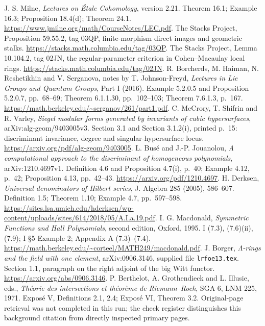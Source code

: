  J. S. Milne, \emph{Lectures on \'Etale Cohomology}, version 2.21. Theorem 16.1; Example 16.3; Proposition 18.4(d); Theorem 24.1. \url{https://www.jmilne.org/math/CourseNotes/LEC.pdf}.
 The Stacks Project, Proposition 59.55.2, tag 03QP, finite-morphism direct images and geometric stalks. \url{https://stacks.math.columbia.edu/tag/03QP}.
 The Stacks Project, Lemma 10.104.2, tag 02JN, the regular-parameter criterion in Cohen--Macaulay local rings. \url{https://stacks.math.columbia.edu/tag/02JN}.
 R. Borcherds, M. Haiman, N. Reshetikhin and V. Serganova, notes by T. Johnson-Freyd, \emph{Lectures in Lie Groups and Quantum Groups}, Part I (2016). Example 5.2.0.5 and Proposition 5.2.0.7, pp.~68--69; Theorem 6.1.1.30, pp.~102--103; Theorem 7.6.1.3, p.~167. \url{https://math.berkeley.edu/~serganov/261/part1.pdf}.
 C. McCrory, T. Shifrin and R. Varley, \emph{Siegel modular forms generated by invariants of cubic hypersurfaces}, arXiv:alg-geom/9403005v3. Section 3.1 and Section 3.1.2(i), printed p.~15: discriminant invariance, degree and singular-hypersurface locus. \url{https://arxiv.org/pdf/alg-geom/9403005}.
 L. Bus\'e and J.-P. Jouanolou, \emph{A computational approach to the discriminant of homogeneous polynomials}, arXiv:1210.4697v1. Definition 4.6 and Proposition 4.7(i), p.~40; Example 4.12, p.~42; Proposition 4.13, pp.~42--43. \url{https://arxiv.org/pdf/1210.4697}.
 H. Derksen, \emph{Universal denominators of Hilbert series}, J. Algebra 285 (2005), 586--607. Definition 1.5; Theorem 1.10; Example 4.7, pp.~597--598. \url{https://sites.lsa.umich.edu/hderksen/wp-content/uploads/sites/614/2018/05/A.I.a.19.pdf}.
 I. G. Macdonald, \emph{Symmetric Functions and Hall Polynomials}, second edition, Oxford, 1995. I (7.3), (7.6)(ii), (7.9); I \S5 Example 2; Appendix A (7.3)--(7.4). \url{https://math.berkeley.edu/~corteel/MATH249/macdonald.pdf}.
 J. Borger, \emph{$\Lambda$-rings and the field with one element}, arXiv:0906.3146, supplied file \texttt{lrfoe13.tex}. Section 1.1, paragraph on the right adjoint of the big Witt functor. \url{https://arxiv.org/abs/0906.3146}.
 P. Berthelot, A. Grothendieck and L. Illusie, eds., \emph{Th\'eorie des intersections et th\'eor\`eme de Riemann--Roch}, SGA 6, LNM 225, 1971. Expos\'e V, Definitions 2.1, 2.4; Expos\'e VI, Theorem 3.2. Original-page retrieval was not completed in this run; the check register distinguishes this background citation from directly inspected primary pages.
